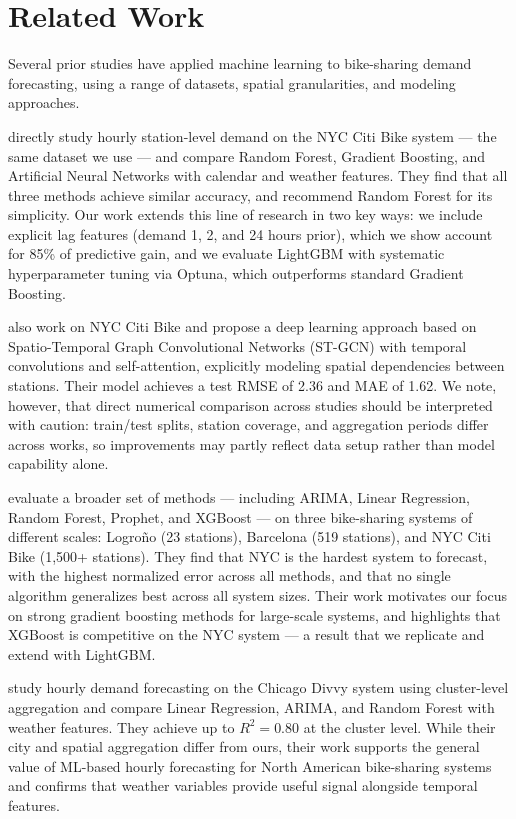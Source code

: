 \documentclass{article}
\begin{document}
\section{Related Work}

Several prior studies have applied machine learning to bike-sharing demand
forecasting, using a range of datasets, spatial granularities, and modeling
approaches.

\citet{torres2024forecasting} directly study hourly station-level demand on
the NYC Citi Bike system — the same dataset we use — and compare Random Forest,
Gradient Boosting, and Artificial Neural Networks with calendar and weather
features. They find that all three methods achieve similar accuracy, and
recommend Random Forest for its simplicity. Our work extends this line of
research in two key ways: we include explicit lag features (demand 1, 2, and 24
hours prior), which we show account for 85\% of predictive gain, and we evaluate
LightGBM with systematic hyperparameter tuning via Optuna, which outperforms
standard Gradient Boosting.

\citet{zhou2024stgcn} also work on NYC Citi Bike and propose a deep
learning approach based on Spatio-Temporal Graph Convolutional Networks
(ST-GCN) with temporal convolutions and self-attention, explicitly modeling
spatial dependencies between stations. Their model achieves a test RMSE of 2.36
and MAE of 1.62. We note, however, that direct numerical comparison across studies should be interpreted with caution: train/test splits, station coverage, and
aggregation periods differ across works, so improvements may partly reflect
data setup rather than model capability alone.

\citet{cortez2023scalability} evaluate a broader set of methods —
including ARIMA, Linear Regression, Random Forest, Prophet, and XGBoost — on
three bike-sharing systems of different scales: Logroño (23 stations),
Barcelona (519 stations), and NYC Citi Bike (1,500+ stations). They find that
NYC is the hardest system to forecast, with the highest normalized error across
all methods, and that no single algorithm generalizes best across all system
sizes. Their work motivates our focus on strong gradient boosting methods for
large-scale systems, and highlights that XGBoost is competitive on the NYC
system — a result that we replicate and extend with LightGBM.

\citet{hosseinpanahi2026ml} study hourly demand forecasting on the
Chicago Divvy system using cluster-level aggregation and compare Linear
Regression, ARIMA, and Random Forest with weather features. They achieve up to
$R^2 = 0.80$ at the cluster level. While their city and spatial aggregation
differ from ours, their work supports the general value of ML-based hourly
forecasting for North American bike-sharing systems and confirms that weather
variables provide useful signal alongside temporal features.
\end{document}
